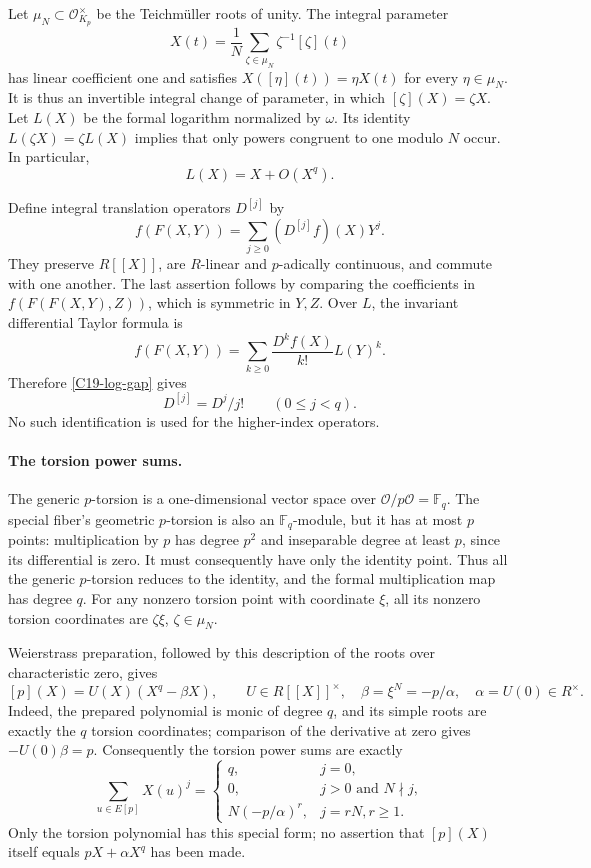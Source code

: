 \documentclass[11pt]{article}
\theoremstyle{definition}\newtheorem{definition}[theorem]{Definition}\newtheorem{remark}[theorem]{Remark}
\begin{document}
Let $\mu_N\subset\mathcal O_{K_p}^\times$ be the Teichm\"uller
roots of unity.  The integral parameter
\[
 X(t)=\frac1N\sum_{\zeta\in\mu_N}\zeta^{-1}[\zeta](t)
\]
has linear coefficient one and satisfies
$X([\eta](t))=\eta X(t)$ for every $\eta\in\mu_N$.
It is thus an invertible integral change of parameter, in which
$[\zeta](X)=\zeta X$.
Let $L(X)$ be the formal logarithm normalized by $\omega$.
Its identity $L(\zeta X)=\zeta L(X)$ implies that only powers
congruent to one modulo $N$ occur.  In particular,
\begin{equation}\label{C19-log-gap}
 L(X)=X+O(X^q).
\end{equation}

Define integral translation operators $D^{[j]}$ by
\[
 f(F(X,Y))=\sum_{j\geq0}(D^{[j]}f)(X)Y^j.
\]
They preserve $R[[X]]$, are $R$-linear and $p$-adically continuous,
and commute with one another.  The last assertion follows by
comparing the coefficients in
$f(F(F(X,Y),Z))$, which is symmetric in $Y,Z$.
Over $L$, the invariant differential Taylor formula is
\[
 f(F(X,Y))=\sum_{k\geq0}\frac{D^kf(X)}{k!}L(Y)^k.
\]
Therefore \eqref{C19-log-gap} gives
\begin{equation}\label{C19-small-Hasse}
 D^{[j]}=D^j/j!\qquad(0\leq j<q).
\end{equation}
No such identification is used for the higher-index operators.

\paragraph{The torsion power sums.}
The generic $p$-torsion is a one-dimensional vector space over
$\mathcal O/p\mathcal O=\mathbb F_q$.  The special fiber's
geometric $p$-torsion is also an $\mathbb F_q$-module, but it has
at most $p$ points: multiplication by $p$ has degree $p^2$ and
inseparable degree at least $p$, since its differential is zero.
It must consequently have only the identity point.
Thus all the generic $p$-torsion reduces to the identity, and
the formal multiplication map has degree $q$.
For any nonzero torsion point with coordinate $\xi$, all its
nonzero torsion coordinates are $\zeta\xi$, $\zeta\in\mu_N$.

Weierstrass preparation, followed by this description of the
roots over characteristic zero, gives
\[
 [p](X)=U(X)(X^q-\beta X),\qquad
 U\in R[[X]]^\times,\quad
 \beta=\xi^N=-p/\alpha,\quad \alpha=U(0)\in R^\times.
\]
Indeed, the prepared polynomial is monic of degree $q$, and its
simple roots are exactly the $q$ torsion coordinates; comparison
of the derivative at zero gives $-U(0)\beta=p$.
Consequently the torsion power sums are exactly
\begin{equation}\label{C19-power-sums}
 \sum_{u\in E[p]}X(u)^j=
 \begin{cases}
 q,&j=0,\\
 0,&j>0\text{ and }N\nmid j,\\
 N(-p/\alpha)^r,&j=rN, r\geq1.
 \end{cases}
\end{equation}
Only the torsion polynomial has this special form; no assertion
that $[p](X)$ itself equals $pX+\alpha X^q$ has been made.
\end{document}
